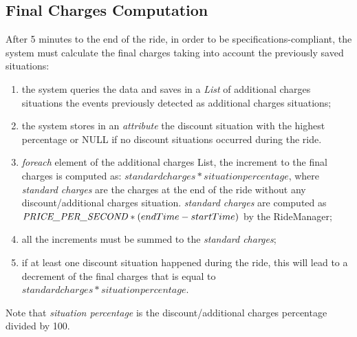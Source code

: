 \subsection{Final Charges Computation}
After 5 minutes to the end of the ride, in order to be specifications-compliant, the system must calculate the final charges taking into account the previously saved situations:
\begin{enumerate}
\item the system queries the data and saves in a \emph{List} of additional charges situations the events previously detected as additional charges situations;
\item the system stores in an \emph{attribute} the discount situation with the highest percentage or NULL if no discount situations occurred during the ride.
\item \emph{foreach} element of the additional charges List, the increment to the final charges is computed as: $standard charges * situation percentage$, where \emph{standard charges} are the charges at the end of the ride without any discount/additional charges situation. \emph{standard charges} are computed as $\text{\emph{PRICE\_PER\_SECOND}} * ( endTime - startTime )$ by the RideManager;
\item all the increments must be summed to the \emph{standard charges};
\item if at least one discount situation happened during the ride, this will lead to a decrement of the final charges that is equal to $standard charges * situation percentage$.
\end{enumerate}
\noindent
Note that \emph{situation percentage} is the discount/additional charges percentage divided by 100. 